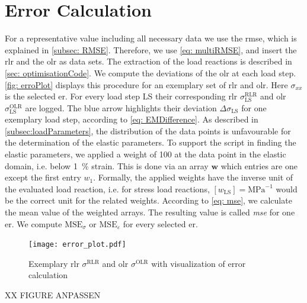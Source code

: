 \section{Error Calculation}\label{sec: errorCalculation}
For a representative value including all necessary data we use the \acrshort{rmse}, which is explained in \autoref{subsec: RMSE}. Therefore, we use \autoref{eq: multiRMSE}, and insert the \acrlong{rlr} and the \acrlong{olr} as data sets.
The extraction of the load reactions is described in \autoref{sec: optimisationCode}.
We compute the deviations of the \acrlong{olr} at each load step. \autoref{fig: erroPlot} displays this procedure for an exemplary set of \acrlong{rlr} and \acrlong{olr}. Here $\sigma_{xx}$ is the selected \acrlong{er}. For every load step LS their corresponding \acrfull{rlr} $\sigma_{\scriptscriptstyle\text{LS}}^{\scriptscriptstyle\text{RLR}}$ and \acrfull{olr} $\sigma_{\scriptscriptstyle\text{LS}}^{\scriptscriptstyle\text{OLR}}$ are logged. The blue arrow highlights their deviation $\Delta\sigma_{\scriptscriptstyle\text{LS}}$ for one exemplary load step, according to \autoref{eq: EMDifference}. 
As described in \autoref{subsec:loadParameters}, the distribution of the data points is unfavourable for the determination of the elastic parameters. 
To support the script in finding the elastic parameters, we applied a weight of 100 at the data point in the elastic domain, i.e. below 1 \% strain. This is done via an array $\boldsymbol{w}$ which entries are one except the first entry $w_{\scriptscriptstyle\text{1}}$. Formally, the applied weights have the inverse unit of the evaluated load reaction, i.e. for stress load reactions, $[w_{\text{LS}}] = \text{MPa}^{-1}$ would be the correct unit for the related weights.
According to \autoref{eq: mse}, we calculate the mean value of the weighted arrays.
The resulting value is called \emph{\acrfull{mse}} for one \acrlong{er}. We compute $\text{MSE}_{\sigma}$ or $\text{MSE}_{\varepsilon}$ for every selected \acrlong{er}. 

\begin{figure}[H]
    \centering
    \texttt{[image: error\_plot.pdf]}
    \caption{Exemplary \acrlong{rlr} $\sigma^{\scriptscriptstyle\text{RLR}}$ and \acrlong{olr} $\sigma^{\scriptscriptstyle\text{OLR}}$ with visualization of error calculation}
    \label{fig: erroPlot}
\end{figure}
XX FIGURE ANPASSEN

